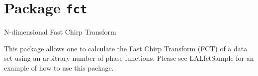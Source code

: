 \chapter{Package \texttt{fct}}

N-dimensional Fast Chirp Transform

This package allows one to calculate the Fast Chirp Transform (FCT) of a
data set using an arbitrary number of phase functions.  Please see
LALfctSample for an example of how to use this package.

\newpage


\newpage







